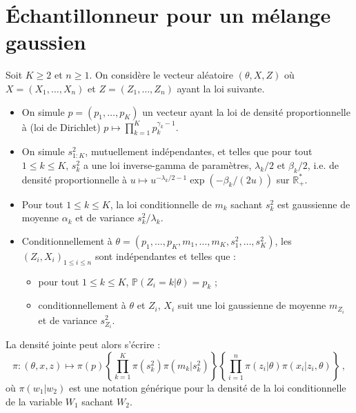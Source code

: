 \documentclass[a4paper,10pt,fleqn]{article}
\newcommand{\1}{\ensuremath{\mathbbm{1}}}
\begin{document}
\section*{\'Echantillonneur pour un m\'elange gaussien}
Soit $K\geq 2$ et $n\geq 1$. On consid\`ere le vecteur al\'eatoire $(\theta,X,Z)$ o\`u $X = (X_1,\ldots,X_n)$ et $Z = (Z_1,\ldots,Z_n)$ ayant la loi suivante.
\begin{itemize}
\item On simule $p = (p_1,\ldots,p_K)$ un vecteur ayant la loi de densit\'e proportionnelle \`a (loi de Dirichlet) $p \mapsto \prod_{k=1}^Kp_k^{\gamma_k-1}$. %
\item On simule $s^2_{1:K}$, mutuellement ind\'ependantes, et telles que pour tout $1\leq k \leq K$, $s^2_k$ a une loi inverse-gamma de param\`etres, $\lambda_k/2$ et $\beta_k/2$, i.e. de densit\'e proportionnelle \`a $u\mapsto u^{-\lambda_k/2-1}\exp(-\beta_k/(2u))$ sur $\mathbb{R}_+^*$.
\item Pour tout $1\leq k \leq K$, la loi conditionnelle de $m_k$ sachant $s_k^2$ est gaussienne de moyenne $\alpha_k$ et de variance $s_k^2/\lambda_k$.
\item Conditionnellement \`a $\theta = (p_{1},\ldots, p_K, m_{1}, \ldots, m_K, s^2_{1},\ldots, s^2_K)$, les $(Z_i,X_i)_{1\leq i \leq n}$ sont ind\'ependantes et telles que :
\begin{itemize}
\item pour tout $1\leq k \leq K$, $\mathbb{P}(Z_i = k|\theta) = p_k$ ;
\item conditionnellement \`a $\theta$ et $Z_i$, $X_i$ suit une loi gaussienne de moyenne $m_{Z_i}$ et de variance $s^2_{Z_i}$.
\end{itemize}
\end{itemize}
La densit\'e jointe peut alors s'\'ecrire :
$$
\pi: (\theta,x,z) \mapsto \pi(p) \left\{\prod_{k=1}^K\pi(s_k^2)\pi(m_k|s_k^2)\right\}\left\{\prod_{i=1}^n\pi(z_i|\theta)\pi(x_i|z_i,\theta)\right\}\,,
$$
o\`u $\pi(w_1|w_2)$ est une notation g\'en\'erique pour la densit\'e de la loi conditionnelle de la variable $W_1$ sachant $W_2$.
\end{document}
